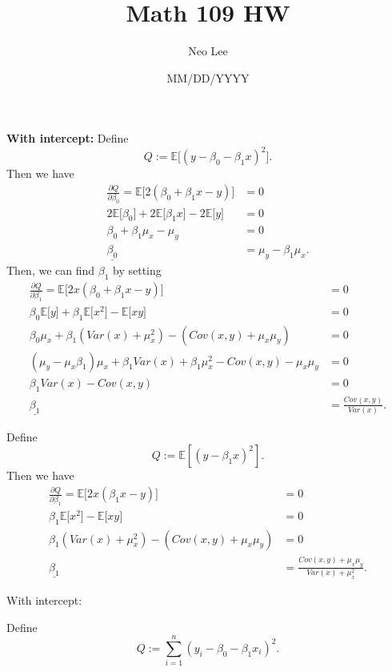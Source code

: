 \documentclass{article}
\title{Math 109 HW}
\author{Neo Lee}
\date{MM/DD/YYYY}
\begin{document}
 

\maketitle 

\textbf{With intercept:}
Define $$Q := \mathbb{E} \big[ (y - \beta_0 - \beta_1 x)^2 \big].$$ Then we have
\begin{align*}
    \frac{\partial Q}{\partial \beta_0} = \mathbb{E} \big[2 (\beta_0 + \beta_1 x - y) \big] & = 0 \\
    2 \mathbb{E}\big[\beta_0 \big] + 2 \mathbb{E}\big[\beta_1 x \big] - 
    2 \mathbb{E}\big[y \big] & = 0 \\
    \beta_0 + \beta_1 \mu_x - \mu_y & = 0 \\
    \underline{\beta_0} & = \mu_y - \beta_1 \mu_x.
\end{align*}
Then, we can find $\beta_1$ by setting
\begin{align*}
    \frac{\partial Q}{\partial \beta_1} = \mathbb{E} \big[2 x (\beta_0 + \beta_1 x - y) \big] & = 0 \\
    \beta_0\mathbb{E}\big[y \big] + \beta_1\mathbb{E}\big[x^2 \big] - \mathbb{E}\big[xy \big] & = 0 \\
    \beta_0\mu_x + \beta_1\left(Var(x)+\mu_x^2\right) - \left(Cov(x,y) + \mu_x\mu_y\right) & = 0 \\
    (\mu_y - \mu_x\beta_1)\mu_x + \beta_1Var(x) + \beta_1\mu_x^2 - Cov(x,y) - \mu_x\mu_y & = 0 \\
    \beta_1Var(x) - Cov(x,y) & = 0 \\
    \underline{\beta_1} & = \frac{Cov(x,y)}{Var(x)}.
\end{align*}

Define $$Q:=\mathbb{E}\left[(y-\beta_1x)^2\right].$$
Then we have
\begin{align*}
    \frac{\partial Q}{\partial \beta_1} = \mathbb{E} \big[2 x (\beta_1 x - y) \big] & = 0 \\
    \beta_1\mathbb{E}\big[x^2 \big] - \mathbb{E}\big[xy \big] & = 0 \\
    \beta_1\left(Var(x)+\mu_x^2\right) - \left(Cov(x,y) + \mu_x\mu_y\right) & = 0 \\
    \underline{\beta_1} & = \frac{Cov(x,y)+\mu_x\mu_y}{Var(x)+\mu_x^2}.
\end{align*}

With intercept:

Define $$Q := \sum_{i=1}^n (y_i - \beta_0 - \beta_1 x_i)^2.$$
\end{document}
